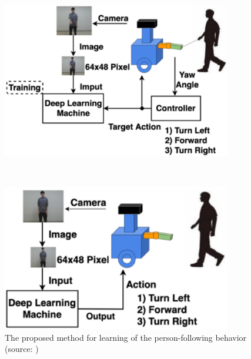   \begin{figure}[h]
    \centering
    \begin{minipage}[c]{100mm} 
        \centering
        \includegraphics[width=100mm]{images/eps/okada_learning_phase_system.eps}
    \end{minipage} \\
    \vspace{1em} %
    \begin{minipage}[c]{100mm} 
        \centering
        \includegraphics[width=100mm]{images/eps/okada_following_phase_system.eps}
    \end{minipage}
    \caption[The proposed method for learning of the person-following behavior]{The proposed method for learning of the person-following behavior (source: \cite{okada})}
    \label{Fig:okada_system}
  \end{figure}

\newpage

